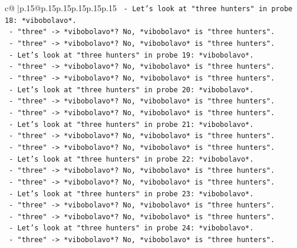 \documentclass{article}
\begin{document}
{\begin{supertabular}{c@{$\;$}|p{.15\linewidth}@{}p{.15\linewidth}p{.15\linewidth}p{.15\linewidth}p{.15\linewidth}p{.15\linewidth}}
{{{\texttt{                  {-} Let's look at "three hunters" in probe 18: *vibobolavo*.} \\
\texttt{                  {-} "three" {-}> *vibobolavo*? No, *vibobolavo* is "three hunters".} \\
\texttt{                  {-} "three" {-}> *vibobolavo*? No, *vibobolavo* is "three hunters".} \\
\texttt{                  {-} Let's look at "three hunters" in probe 19: *vibobolavo*.} \\
\texttt{                  {-} "three" {-}> *vibobolavo*? No, *vibobolavo* is "three hunters".} \\
\texttt{                  {-} "three" {-}> *vibobolavo*? No, *vibobolavo* is "three hunters".} \\
\texttt{                  {-} Let's look at "three hunters" in probe 20: *vibobolavo*.} \\
\texttt{                  {-} "three" {-}> *vibobolavo*? No, *vibobolavo* is "three hunters".} \\
\texttt{                  {-} "three" {-}> *vibobolavo*? No, *vibobolavo* is "three hunters".} \\
\texttt{                  {-} Let's look at "three hunters" in probe 21: *vibobolavo*.} \\
\texttt{                  {-} "three" {-}> *vibobolavo*? No, *vibobolavo* is "three hunters".} \\
\texttt{                  {-} "three" {-}> *vibobolavo*? No, *vibobolavo* is "three hunters".} \\
\texttt{                  {-} Let's look at "three hunters" in probe 22: *vibobolavo*.} \\
\texttt{                  {-} "three" {-}> *vibobolavo*? No, *vibobolavo* is "three hunters".} \\
\texttt{                  {-} "three" {-}> *vibobolavo*? No, *vibobolavo* is "three hunters".} \\
\texttt{                  {-} Let's look at "three hunters" in probe 23: *vibobolavo*.} \\
\texttt{                  {-} "three" {-}> *vibobolavo*? No, *vibobolavo* is "three hunters".} \\
\texttt{                  {-} "three" {-}> *vibobolavo*? No, *vibobolavo* is "three hunters".} \\
\texttt{                  {-} Let's look at "three hunters" in probe 24: *vibobolavo*.} \\
\texttt{                  {-} "three" {-}> *vibobolavo*? No, *vibobolavo* is "three hunters".} \\
}}}
\end{supertabular}}
\end{document}
